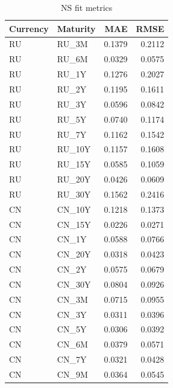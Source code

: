 \begin{table}
\caption{NS fit metrics}
\label{tab:6_1}
\begin{tabular}{llrr}
\toprule
Currency & Maturity & MAE & RMSE \\
\midrule
RU & RU_3M & 0.1379 & 0.2112 \\
RU & RU_6M & 0.0329 & 0.0575 \\
RU & RU_1Y & 0.1276 & 0.2027 \\
RU & RU_2Y & 0.1195 & 0.1611 \\
RU & RU_3Y & 0.0596 & 0.0842 \\
RU & RU_5Y & 0.0740 & 0.1174 \\
RU & RU_7Y & 0.1162 & 0.1542 \\
RU & RU_10Y & 0.1157 & 0.1608 \\
RU & RU_15Y & 0.0585 & 0.1059 \\
RU & RU_20Y & 0.0426 & 0.0609 \\
RU & RU_30Y & 0.1562 & 0.2416 \\
CN & CN_10Y & 0.1218 & 0.1373 \\
CN & CN_15Y & 0.0226 & 0.0271 \\
CN & CN_1Y & 0.0588 & 0.0766 \\
CN & CN_20Y & 0.0318 & 0.0423 \\
CN & CN_2Y & 0.0575 & 0.0679 \\
CN & CN_30Y & 0.0804 & 0.0926 \\
CN & CN_3M & 0.0715 & 0.0955 \\
CN & CN_3Y & 0.0311 & 0.0396 \\
CN & CN_5Y & 0.0306 & 0.0392 \\
CN & CN_6M & 0.0379 & 0.0571 \\
CN & CN_7Y & 0.0321 & 0.0428 \\
CN & CN_9M & 0.0364 & 0.0545 \\
\bottomrule
\end{tabular}
\end{table}
